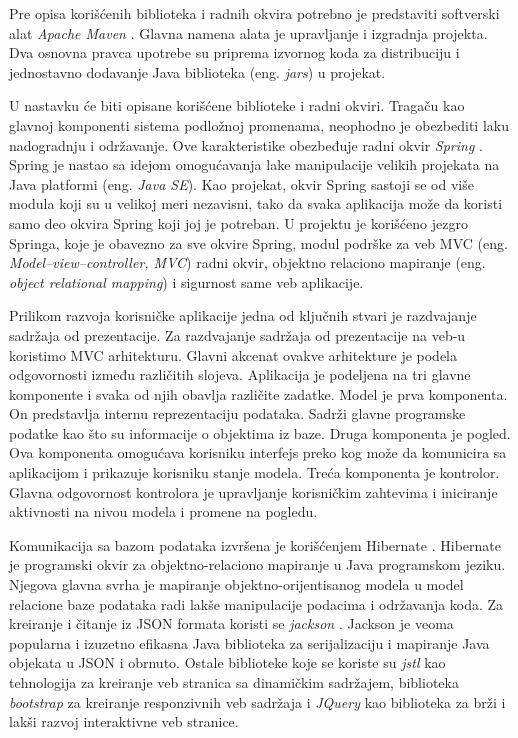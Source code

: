 \documentclass[12pt,oneside]{memoir}
\begin{document}
Pre opisa korišćenih biblioteka i radnih okvira potrebno je predstaviti softverski alat \textit{Apache Maven} \cite{Maven}. Glavna namena alata je upravljanje i izgradnja projekta. Dva osnovna pravca upotrebe su priprema izvornog koda za distribuciju i jednostavno dodavanje Java biblioteka (eng. \textit{jars}) u projekat. 

U nastavku će biti opisane korišćene biblioteke i radni okviri. Tragaču kao glavnoj komponenti sistema podložnoj promenama, neophodno je obezbediti laku nadogradnju i održavanje. Ove karakteristike obezbeđuje radni okvir \textit{Spring} \cite{Spring}. Spring je nastao sa idejom omogućavanja lake manipulacije velikih projekata na Java platformi (eng. \textit{Java SE}). Kao projekat, okvir Spring sastoji se od više modula koji su u velikoj meri nezavisni, tako da svaka aplikacija može da koristi samo deo okvira Spring koji joj je potreban. U projektu je korišćeno jezgro Springa, koje je obavezno za sve okvire Spring, modul podrške za veb MVC (eng. \textit{Model–view–controller, MVC}) radni okvir, objektno relaciono mapiranje (eng. \textit{object relational mapping}) i sigurnost same veb aplikacije.

Prilikom razvoja korisničke aplikacije jedna od ključnih stvari je razdvajanje sadržaja od prezentacije. Za razdvajanje sadržaja od prezentacije na veb-u koristimo MVC arhitekturu. Glavni akcenat ovakve arhitekture je podela odgovornosti između različitih slojeva. Aplikacija je podeljena na tri glavne komponente i svaka od njih obavlja različite zadatke. Model je prva komponenta. On predstavlja internu reprezentaciju podataka. Sadrži glavne programske podatke kao što su informacije o objektima iz baze. Druga komponenta je pogled. Ova komponenta omogućava korisniku interfejs preko kog može da komunicira sa aplikacijom i prikazuje korisniku stanje modela. Treća komponenta je kontrolor. Glavna odgovornost kontrolora je upravljanje korisničkim zahtevima i iniciranje aktivnosti na nivou modela i promene na pogledu. 

Komunikacija sa bazom podataka izvršena je korišćenjem Hibernate \cite{Hibernate}. Hibernate je programski okvir za objektno-relaciono mapiranje u Java programskom jeziku. Njegova glavna svrha je mapiranje objektno-orijentisanog modela u model relacione baze podataka radi lakše manipulacije podacima i održavanja koda. Za kreiranje i čitanje iz JSON formata koristi se \textit{jackson} \cite{Jackson}. Jackson je veoma popularna i izuzetno efikasna Java biblioteka za serijalizaciju i mapiranje Java objekata u JSON i obrnuto. Ostale biblioteke koje se koriste su \textit{jstl} \cite{JSTL} kao tehnologija za kreiranje veb stranica sa dinamičkim sadržajem, biblioteka \textit{bootstrap} \cite{Bootstrap} za kreiranje responzivnih veb sadržaja i \textit{JQuery} \cite{JQuery} kao biblioteka za brži i lakši razvoj interaktivne veb stranice. 
\end{document}
